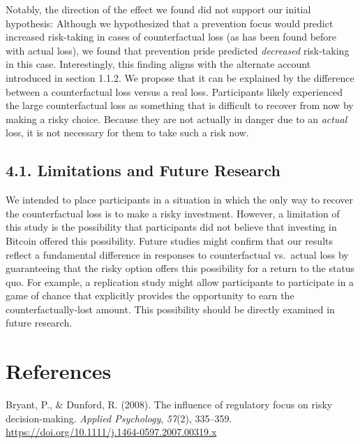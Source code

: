 \documentclass[man,floatsintext]{apa6}
\begin{document}
Notably, the direction of the effect we found did not support our initial hypothesis: Although we hypothesized that a prevention focus would predict increased risk-taking in cases of counterfactual loss (as has been found before with actual loss), we found that prevention pride predicted \emph{decreased} risk-taking in this case. Interestingly, this finding aligns with the alternate account introduced in section 1.1.2. We propose that it can be explained by the difference between a counterfactual loss versus a real loss. Participants likely experienced the large counterfactual loss as something that is difficult to recover from now by making a risky choice. Because they are not actually in danger due to an \emph{actual} loss, it is not necessary for them to take such a risk now.

\hypertarget{limitations-and-future-research}{%
\subsection{4.1. Limitations and Future Research}\label{limitations-and-future-research}}

We intended to place participants in a situation in which the only way to recover the counterfactual loss is to make a risky investment. However, a limitation of this study is the possibility that participants did not believe that investing in Bitcoin offered this possibility. Future studies might confirm that our results reflect a fundamental difference in responses to counterfactual vs.~actual loss by guaranteeing that the risky option offers this possibility for a return to the status quo. For example, a replication study might allow participants to participate in a game of chance that explicitly provides the opportunity to earn the counterfactually-lost amount. This possibility should be directly examined in future research.

\newpage

\hypertarget{references}{%
\section{References}\label{references}}

\begingroup
\setlength{\parindent}{-0.5in}
\setlength{\leftskip}{0.5in}

\hypertarget{refs}{}
\leavevmode\hypertarget{ref-bryantdunford2008}{}%
Bryant, P., \& Dunford, R. (2008). The influence of regulatory focus on risky decision-making. \emph{Applied Psychology}, \emph{57}(2), 335--359. \url{https://doi.org/10.1111/j.1464-0597.2007.00319.x}
\end{document}
